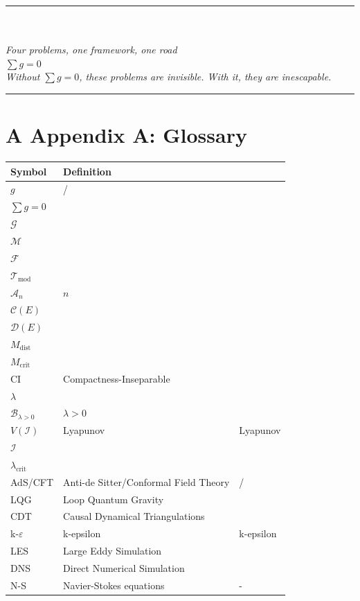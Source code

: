 \documentclass[12pt,a4paper]{article}
\theoremstyle{remark}
\newcommand{\D}{\mathcal{D}}
\newcommand{\G}{\mathcal{G}}
\newcommand{\T}{\mathcal{T}}
\newcommand{\M}{\mathcal{M}}
\newcommand{\F}{\mathcal{F}}
\newcommand{\A}{\mathcal{A}}
\newcommand{\B}{\mathcal{B}}
\begin{document}
\begin{center}
\rule{\textwidth}{1pt}\\[0.5cm]
{\large \textbf{}}\\[0.3cm]
\textit{Four problems, one framework, one road}\\[0.5cm]
{\small $\sum g = 0$}\\
\textit{Without $\sum g = 0$, these problems are invisible. With it, they are inescapable.}\\[0.5cm]
\rule{\textwidth}{1pt}
\end{center}

\newpage


\section*{A Appendix A: Glossary}

\begin{center}
\begin{tabular}{l|l|l}
    \toprule
    \textbf{ Symbol} & \textbf{ Definition} & \textbf{} \\
    \midrule
    $g$ &  /  &  \\
    $\sum g = 0$ &  &  \\
    $\G$ &  &  \\
    $\M$ &  &  \\
    $\F$ &  &  \\
    $\T_{\text{mod}}$ &  &  \\
    $\A_n$ & $n$ &  \\
    $\mathcal{C}(E)$ &  &  \\
    $\D(E)$ &  &  \\
    $M_{\text{dist}}$ &  &  \\
    $M_{\text{crit}}$ &  &  \\
    CI & Compactness-Inseparable &  \\
    $\lambda$ &  &  \\
    $\B_{\lambda>0}$ & $\lambda>0$ &  \\
    $V(\mathcal{I})$ & Lyapunov & Lyapunov \\
    $\mathcal{I}$ &  &  \\
    $\lambda_{\text{crit}}$ &  &  \\
    AdS/CFT & Anti-de Sitter/Conformal Field Theory & / \\
    LQG & Loop Quantum Gravity &  \\
    CDT & Causal Dynamical Triangulations &  \\
    k-$\varepsilon$ & k-epsilon & k-epsilon \\
    LES & Large Eddy Simulation &  \\
    DNS & Direct Numerical Simulation &  \\
    N-S & Navier-Stokes equations & - \\
    \bottomrule
\end{tabular}
\end{center}
\end{document}
